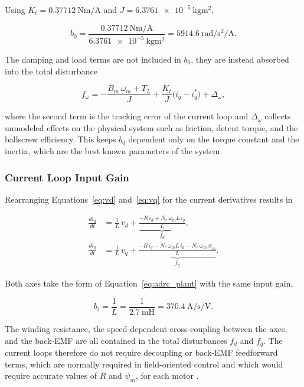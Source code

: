 Using $K_t = \SI{0.37712}{\newton\meter\per\ampere}$ and $J = \SI{6.3761e-5}{\kilo\gram\meter\squared}$,

\begin{equation}
	b_0 = \frac{\SI{0.37712}{\newton\meter\per\ampere}}
	{\SI{6.3761e-5}{\kilo\gram\meter\squared}}
	= \SI{5914.6}{\radian\per\second\squared\per\ampere}.
	\label{eq:b0_value}
\end{equation}

The damping and load terms are not included in $b_0$, they are instead absorbed into the total disturbance

\begin{equation}
	f_\omega = -\frac{B_m\,\omega_m + T_L}{J}
	+ \frac{K_t}{J}\big( i_q - i_q^{*} \big) + \Delta_\omega,
	\label{eq:f_omega}
\end{equation}

where the second term is the tracking error of the current loop and $\Delta_\omega$ collects unmodeled effects on the physical system such as friction, detent torque, and the ballscrew efficiency. This keeps $b_0$ dependent only on the torque constant and the inertia, which are the best known parameters of the system.

\subsubsection{Current Loop Input Gain}

Rearranging Equations~\eqref{eq:vd} and~\eqref{eq:vq} for the current derivatives results in

\begin{align}
	\frac{di_d}{dt} &= \frac{1}{L}\, v_d
	+ \underbrace{\frac{-R\, i_d + N_r\,\omega_m L\, i_q}{L}}_{f_d},
	\label{eq:did_dt} \\
	\frac{di_q}{dt} &= \frac{1}{L}\, v_q
	+ \underbrace{\frac{-R\, i_q - N_r\,\omega_m L\, i_d
			- N_r\,\omega_m\,\psi_m}{L}}_{f_q}.
	\label{eq:diq_dt}
\end{align}

Both axes take the form of Equation~\eqref{eq:adrc_plant} with the same input gain,

\begin{equation}
	b_i = \frac{1}{L} = \frac{1}{\SI{2.7}{\milli\henry}}
	= \SI{370.4}{\ampere\per\second\per\volt}.
	\label{eq:bi}
\end{equation}

The winding resistance, the speed-dependent cross-coupling between the axes, and the back-EMF are all contained in the total disturbances $f_d$ and $f_q$. The current loops therefore do not require decoupling or back-EMF feedforward terms, which are normally required in field-oriented control and which would require accurate values of $R$ and $\psi_m$, for each motor \cite{briz_analysis_2000}. 

